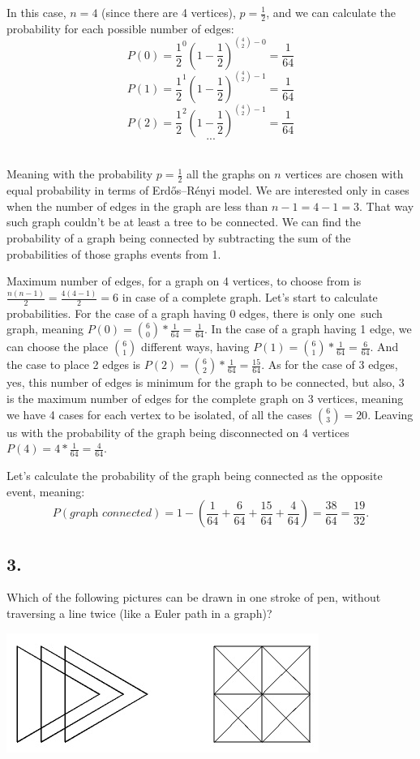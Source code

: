 \documentclass[a4paper]{article}
\begin{document}
\par In this case, \(n = 4\) (since there are 4 vertices), \(p = \frac{1}{2}\), and we can calculate the probability for each possible number of edges:
\[
P(0) = \frac{1}{2}^0(1-\frac{1}{2})^{\binom{4}{2}-0} = \frac{1}{64}
\]
\[
P(1) = \frac{1}{2}^1(1-\frac{1}{2})^{\binom{4}{2}-1} = \frac{1}{64}
\]
\[
P(2) = \frac{1}{2}^2(1-\frac{1}{2})^{\binom{4}{2}-1} = \frac{1}{64}
\]
\[
...
\] \\
\par Meaning with the probability \(p=\frac{1}{2}\) all the graphs on \(n\) vertices are chosen with equal probability in terms of Erdős–Rényi model.
We are interested only in cases when the number of edges in the graph are less than \(n-1=4-1=3\). That way such graph couldn’t be at least a tree to be connected. We can find the probability of a graph being connected by subtracting the sum of the probabilities of those graphs events from 1. \\
\par Maximum number of edges, for a graph on 4 vertices, to choose from is \(\frac{n(n-1)}{2}=\frac{4(4-1)}{2}=6\) in case of a complete graph. Let's start to calculate probabilities. For the case of a graph having 0 edges, there is only one such graph, meaning \(P(0) = \binom{6}{0} * \frac{1}{64}=\frac{1}{64}\). In the case of a graph having 1 edge, we can choose the place \(\binom{6}{1}\) different ways, having \(P(1)=\binom{6}{1}*\frac{1}{64}=\frac{6}{64}\). And the case to place 2 edges is \(P(2)=\binom{6}{2}*\frac{1}{64}=\frac{15}{64}\). As for the case of 3 edges, yes, this number of edges is minimum for the graph to be connected, but also, 3 is the maximum number of edges for the complete graph on 3 vertices, meaning we have 4 cases for each vertex to be isolated, of all the cases \(\binom{6}{3}=20\). Leaving us with the probability of the graph being disconnected on 4 vertices \(P(4) = 4 * \frac{1}{64}=\frac{4}{64}\). \\
\par Let's calculate the probability of the graph being connected as the opposite event, meaning:
\[
P(\textit{graph connected}) = 1 - \left(\frac{1}{64} +\frac{6}{64} + \frac{15}{64}+\frac{4}{64}\right)=\frac{38}{64}=\frac{19}{32}.
\]
\subsection*{3.}
Which of the following pictures can be drawn in one stroke of pen, without traversing a line twice (like a Euler path in a graph)?
\begin{center}
\includegraphics{task3.png}    
\end{center}
\end{document}
